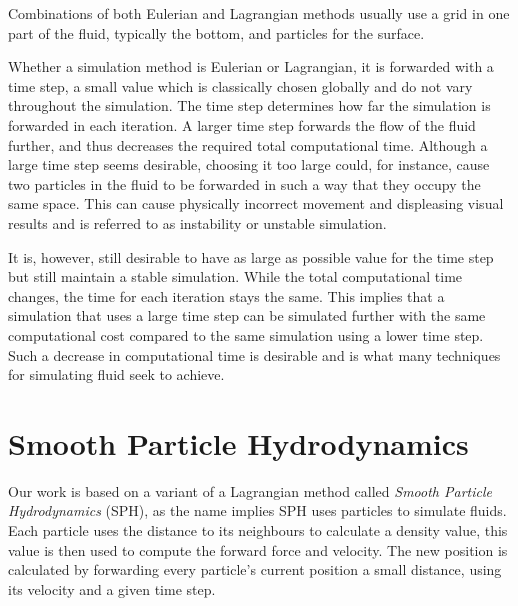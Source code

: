 \documentclass[../../main.tex]{subfiles}
\begin{document}
Combinations of both Eulerian and Lagrangian methods usually use a grid in one part of the fluid, typically the bottom, and particles for the surface. 

Whether a simulation method is Eulerian or Lagrangian, it is forwarded with a time step, a small value which is classically chosen globally and do not vary throughout the simulation. The time step determines how far the simulation is forwarded in each iteration. A larger time step forwards the flow of the fluid further, and thus decreases the required total computational time. Although a large time step seems desirable, choosing it too large could, for instance, cause two particles in the fluid to be forwarded in such a way that they occupy the same space. This can cause physically incorrect movement and displeasing visual results and is referred to as instability or unstable simulation.

It is, however, still desirable to have as large as possible value for the time step but still maintain a stable simulation. While the total computational time changes, the time for each iteration stays the same. This implies that a simulation that uses a large time step can be simulated further with the same computational cost compared to the same simulation using a lower time step. Such a decrease in computational time is desirable and is what many techniques for simulating fluid seek to achieve.


\section{Smooth Particle Hydrodynamics}
Our work is based on a variant of a Lagrangian method called \textit{Smooth Particle Hydrodynamics} (SPH), as the name implies SPH uses particles to simulate fluids. Each particle uses the distance to its neighbours to calculate a density value, this value is then used to compute the forward force and velocity. The new position is calculated by forwarding every particle's current position a small distance, using its velocity and a given time step. 
\end{document}

